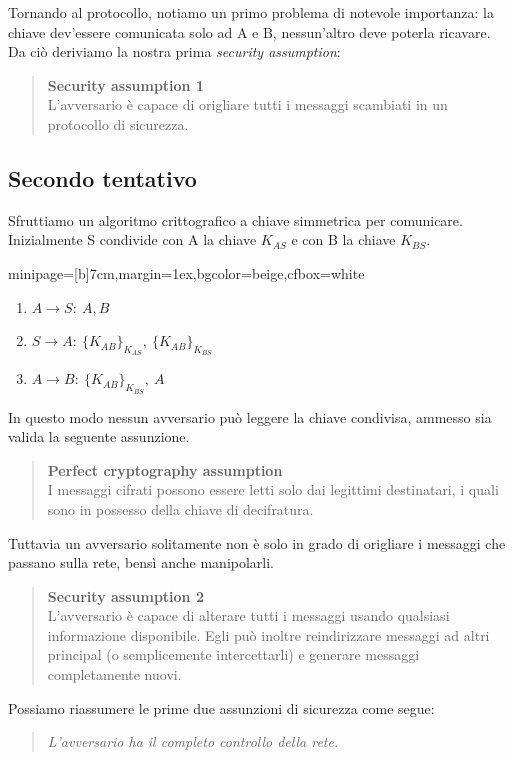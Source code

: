 \documentclass[a4paper, 11pt, twoside, openright, fleqn]{report}
\newcommand{\fromto}[2]{#1\rightarrow #2\!:\ }
\newenvironment{colbox}[2]%
{%
	\par\noindent\hspace{10pt}
	\begin{adjustbox}{minipage=[b]{#2},margin=1ex,bgcolor=#1,cfbox=white}
}{%
	\end{adjustbox}\newline%
}
\begin{document}
Tornando al protocollo, notiamo un primo problema di notevole importanza: la chiave dev'essere comunicata solo ad A e B, nessun'altro deve poterla ricavare. Da ciò deriviamo la nostra prima \emph{security assumption}:
\begin{quote}
	\textbf{Security assumption 1}\\
	L'avversario è capace di origliare tutti i messaggi scambiati in un protocollo di sicurezza.
\end{quote}

\subsection{Secondo tentativo}
Sfruttiamo un algoritmo crittografico a chiave simmetrica per comunicare. Inizialmente S condivide con A la chiave $K_{AS}$ e con B la chiave $K_{BS}$.
\begin{colbox}{beige}{7cm}
	\begin{enumerate}
		\item $\fromto{A}{S}A, B$
		\item $\fromto{S}{A}\{K_{AB}\}_{K_{AS}},\ \{K_{AB}\}_{K_{BS}}$
		\item $\fromto{A}{B}\{K_{AB}\}_{K_{BS}},\ A$
	\end{enumerate}
\end{colbox}
In questo modo nessun avversario può leggere la chiave condivisa, ammesso sia valida la seguente assunzione.
\begin{quote}
	\textbf{Perfect cryptography assumption}\\
	I messaggi cifrati possono essere letti solo dai legittimi destinatari, i quali sono in possesso della chiave di decifratura.
\end{quote}
Tuttavia un avversario solitamente non è solo in grado di origliare i messaggi che passano sulla rete, bensì anche manipolarli.
\begin{quote}
	\textbf{Security assumption 2}\\
	L'avversario è capace di alterare tutti i messaggi usando qualsiasi informazione disponibile. Egli può inoltre reindirizzare messaggi ad altri principal (o semplicemente intercettarli) e generare messaggi completamente nuovi.
\end{quote}
Possiamo riassumere le prime due assunzioni di sicurezza come segue:
\begin{quote}
	\emph{L'avversario ha il completo controllo della rete.}
\end{quote}
\end{document}
